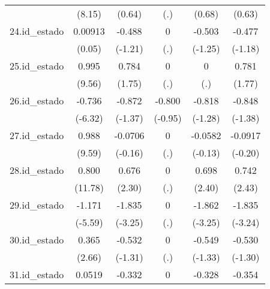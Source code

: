 {\begin{tabular}{l*{5}{c}}
            &      (8.15)         &      (0.64)         &         (.)         &      (0.68)         &      (0.63)         \\
[1em]
24.id\_estado&     0.00913         &      -0.488         &           0         &      -0.503         &      -0.477         \\
            &      (0.05)         &     (-1.21)         &         (.)         &     (-1.25)         &     (-1.18)         \\
[1em]
25.id\_estado&       0.995\sym{***}&       0.784         &           0         &           0         &       0.781         \\
            &      (9.56)         &      (1.75)         &         (.)         &         (.)         &      (1.77)         \\
[1em]
26.id\_estado&      -0.736\sym{***}&      -0.872         &      -0.800         &      -0.818         &      -0.848         \\
            &     (-6.32)         &     (-1.37)         &     (-0.95)         &     (-1.28)         &     (-1.38)         \\
[1em]
27.id\_estado&       0.988\sym{***}&     -0.0706         &           0         &     -0.0582         &     -0.0917         \\
            &      (9.59)         &     (-0.16)         &         (.)         &     (-0.13)         &     (-0.20)         \\
[1em]
28.id\_estado&       0.800\sym{***}&       0.676\sym{*}  &           0         &       0.698\sym{*}  &       0.742\sym{*}  \\
            &     (11.78)         &      (2.30)         &         (.)         &      (2.40)         &      (2.43)         \\
[1em]
29.id\_estado&      -1.171\sym{***}&      -1.835\sym{**} &           0         &      -1.862\sym{**} &      -1.835\sym{**} \\
            &     (-5.59)         &     (-3.25)         &         (.)         &     (-3.25)         &     (-3.24)         \\
[1em]
30.id\_estado&       0.365\sym{**} &      -0.532         &           0         &      -0.549         &      -0.530         \\
            &      (2.66)         &     (-1.31)         &         (.)         &     (-1.33)         &     (-1.30)         \\
[1em]
31.id\_estado&      0.0519         &      -0.332         &           0         &      -0.328         &      -0.354         \\

\end{tabular}}
